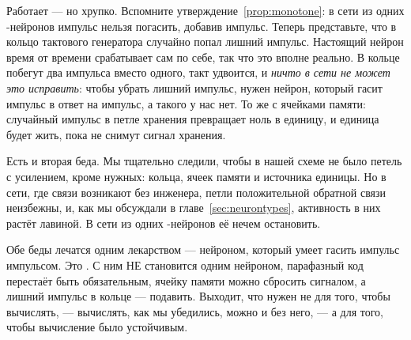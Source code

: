 Работает --- но хрупко. Вспомните утверждение~\ref{prop:monotone}: в сети из одних -нейронов импульс нельзя погасить, добавив импульс. Теперь представьте, что в кольцо тактового генератора случайно попал лишний импульс. Настоящий нейрон время от времени срабатывает сам по себе, так что это вполне реально. В кольце побегут два импульса вместо одного, такт удвоится, и \emph{ничто в сети не может это исправить}: чтобы убрать лишний импульс, нужен нейрон, который гасит импульс в ответ на импульс, а такого у нас нет. То же с ячейками памяти: случайный импульс в петле хранения превращает ноль в единицу, и единица будет жить, пока не снимут сигнал хранения.

Есть и вторая беда. Мы тщательно следили, чтобы в нашей схеме не было петель с усилением, кроме нужных: кольца, ячеек памяти и источника единицы. Но в сети, где связи возникают без инженера, петли положительной обратной связи неизбежны, и, как мы обсуждали в главе~\ref{sec:neurontypes}, активность в них растёт лавиной. В сети из одних -нейронов её нечем остановить.

Обе беды лечатся одним лекарством --- нейроном, который умеет гасить импульс импульсом. Это . С ним НЕ становится одним нейроном, парафазный код перестаёт быть обязательным, ячейку памяти можно сбросить сигналом, а лишний импульс в кольце --- подавить. Выходит, что  нужен не для того, чтобы вычислять, --- вычислять, как мы убедились, можно и без него, --- а для того, чтобы вычисление было устойчивым.
